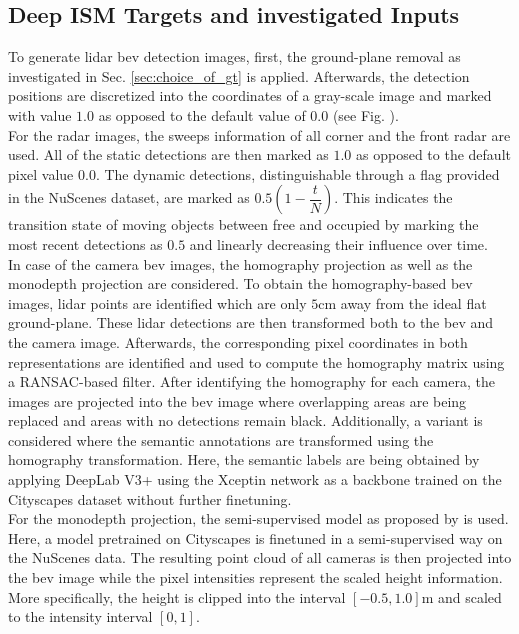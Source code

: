 \subsection{Deep ISM Targets and investigated Inputs}
\label{subsec:def_of_targets_n_inputs}
To generate lidar \gls{bev} detection images, first, the ground-plane removal as investigated in Sec. \ref{sec:choice_of_gt} is applied. Afterwards, the detection positions are discretized into the coordinates of a gray-scale image and marked with value $1.0$ as opposed to the default value of $0.0$ (see Fig. ).
\\
For the radar images, the sweeps information of all corner and the front radar are used. All of the static detections are then marked as $1.0$ as opposed to the default pixel value $0.0$. The dynamic detections, distinguishable through a flag provided in the NuScenes dataset, are marked as $0.5(1-\dfrac{t}{N})$. This indicates the transition state of moving objects between free and occupied by marking the most recent detections as $0.5$ and linearly decreasing their influence over time.
\\
In case of the camera \gls{bev} images, the homography projection as well as the monodepth projection are considered. To obtain the homography-based \gls{bev} images, lidar points are identified which are only $5$cm away from the ideal flat ground-plane. These lidar detections are then transformed both to the \gls{bev} and the camera image. Afterwards, the corresponding pixel coordinates in both representations are identified and used to compute the homography matrix using a RANSAC-based filter. After identifying the homography for each camera, the images are projected into the \gls{bev} image where overlapping areas are being replaced and areas with no detections remain black. Additionally, a variant is considered where the semantic annotations are transformed using the homography transformation. Here, the semantic labels are being obtained by applying DeepLab V3+ \cite{deeplabv3plus2018} using the Xceptin network \cite{chollet2017xception} as a backbone trained on the Cityscapes dataset without further finetuning.
\\
For the monodepth projection, the semi-supervised model as proposed by \cite{guizilini2020robust} is used. Here, a model pretrained on Cityscapes is finetuned in a semi-supervised way on the NuScenes data. The resulting point cloud of all cameras is then projected into the \gls{bev} image while the pixel intensities represent the scaled height information. More specifically, the height is clipped into the interval $[-0.5,1.0]$m and scaled to the intensity interval $[0,1]$.
